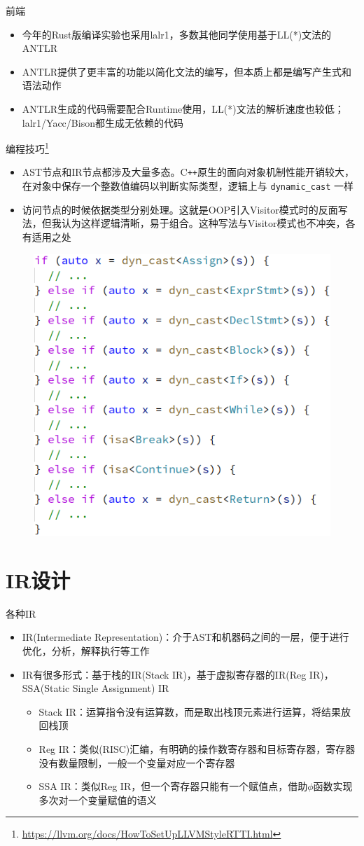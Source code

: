 \documentclass{beamer}
\begin{document}
\begin{frame}{前端}
\begin{itemize}
  \item 今年的Rust版编译实验也采用lalr1，多数其他同学使用基于LL(*)文法的ANTLR
  \item ANTLR提供了更丰富的功能以简化文法的编写，但本质上都是编写产生式和语法动作
  \item ANTLR生成的代码需要配合Runtime使用，LL(*)文法的解析速度也较低；lalr1/Yacc/Bison都生成无依赖的代码
\end{itemize}
\end{frame}

\begin{frame}{编程技巧\footnote[1]{\href{https://llvm.org/docs/HowToSetUpLLVMStyleRTTI.html}{https://llvm.org/docs/HowToSetUpLLVMStyleRTTI.html}}}
\begin{itemize}
  \item AST节点和IR节点都涉及大量多态。C\texttt{++}原生的面向对象机制性能开销较大，在对象中保存一个整数值编码以判断实际类型，逻辑上与 \lstinline|dynamic_cast| 一样
  \item 访问节点的时候依据类型分别处理。这就是OOP引入Visitor模式时的反面写法，但我认为这样逻辑清晰，易于组合。这种写法与Visitor模式也不冲突，各有适用之处
\end{itemize}
\begin{figure}[htpb]
  \centering
  \includegraphics[width=0.35\linewidth]{pic/match.png}
\end{figure}
\end{frame}

\section{IR设计}

\begin{frame}{各种IR}
\begin{itemize}
  \item IR(Intermediate Representation)：介于AST和机器码之间的一层，便于进行优化，分析，解释执行等工作
  \item IR有很多形式：基于栈的IR(Stack IR)，基于虚拟寄存器的IR(Reg IR)，SSA(Static Single Assignment) IR
  \begin{itemize}
    \item Stack IR：运算指令没有运算数，而是取出栈顶元素进行运算，将结果放回栈顶
    \item Reg IR：类似(RISC)汇编，有明确的操作数寄存器和目标寄存器，寄存器没有数量限制，一般一个变量对应一个寄存器
    \item SSA IR：类似Reg IR，但一个寄存器只能有一个赋值点，借助$\phi$函数实现多次对一个变量赋值的语义
  \end{itemize}
\end{itemize}
\end{frame}
\end{document}

